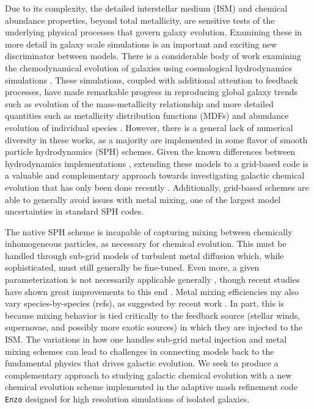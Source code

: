 \documentclass[twocolumn]{aastex61}
\begin{document}
Due to its complexity, the detailed interstellar medium (ISM) and chemical abundance properties, beyond total metallicity, are sensitive tests of the underlying physical processes that govern galaxy evolution. Examining these in more detail in galaxy scale simulations is an important and exciting new discriminator between models. There is a considerable body of work examining the chemodynamical evolution of galaxies using cosmological hydrodynamics simulations \citep[e.g.][]{Lia2002,KawataGibson2003,Kobayashi2004,Tornatore2004,Romeo2005,OppenheimerDave2008,Wiersma2009,Shen2010,MUGS2010,ErisSimulation,Brook2014,Snaith2015,Oppenheimer2016,OWLS,EAGLE,FIRE}. These simulations, coupled with additional attention to feedback processes, have made remarkable progress in reproducing global galaxy trends such as evolution of the mass-metallicity relationship \citep[e.g.][]{Obreja2014, Ma2016, Dave2017} and more detailed quantities such as metallicity distribution functions (MDFs) and abundance evolution of individual species \citep{Marcolini2008,Revaz2009,Sawala2010,RevazJablonka2012,Jeon2017,Hirai2017} . However, there is a general lack of numerical diversity in these works, as a majority are implemented in some flavor of smooth particle hydrodynamics (SPH) schemes. Given the known differences between hydrodynamics implementations \citep{Agertz2007,AGORA,AGORA2}, extending these models to a grid-based code is a valuable and complementary approach towards investigating galactic chemical evolution that has only been done recently \citep{Few2012,Few2014,Vorobyov2015}. Additionally, grid-based schemes are able to generally avoid issues with metal mixing, one of the largest model uncertainties in standard SPH codes.

The native SPH scheme is incapable of capturing mixing between chemically inhomogeneous particles, as necessary for chemical evolution. This must be handled through sub-grid models of turbulent metal diffusion \citep[e.g.][]{Shen2010, Shen2013,Brook2014,Su2017} which, while sophisticated, must still generally be fine-tuned. Even more, a given parameterization is not necessarily applicable generally \citep{Revaz2016}, though recent studies have shown great improvements to this end \citep{Escala2017}. Metal mixing efficiencies my also vary species-by-species (refs), as suggested by recent work \citep[e.g.][]{Cohen2013, Roederer2014, FrebelNorris2015, Hirai2017, Cote2017}. In part, this is because mixing behavior is tied critically to the feedback source (stellar winds, supernovae, and possibly more exotic sources) in which they are injected to the ISM. The variations in how one handles sub-grid metal injection and metal mixing schemes can lead to challenges in connecting models back to the fundamental physics that drives galactic evolution. We seek to produce a complementary approach to studying galactic chemical evolution with a new chemical evolution scheme implemented in the adaptive mash refinement code \texttt{Enzo} designed for high resolution simulations of isolated galaxies. 
\end{document}
